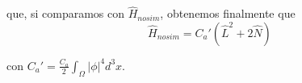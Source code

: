 que, si comparamos con $\hat{H}_{nosim}$, obtenemos finalmente que 
\begin{equation}
\hat{H}_{nosim} = C_a'\left( \hat{L}^2 + 2\hat{N} \right)
\label{h_nosim_integ}
\end{equation}

con $C_a' = \frac{C_a}{2}\int_{\Omega}|\phi|^4d^3x$.










